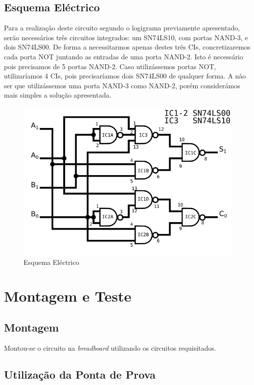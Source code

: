 \documentclass[a4paper,12pt]{article}
\begin{document}
\subsection{Esquema Eléctrico}
Para a realização deste circuito segundo o logigrama previamente apresentado, serão necessários três circuitos integrados: um SN74LS10, com portas NAND-3, e dois SN74LS00. De forma a necessitarmos apenas destes três CIs, concretizaremos cada porta NOT juntando as entradas de uma porta NAND-2. Isto é necessário pois precisamos de 5 portas NAND-2. Caso utilizássemos portas NOT, utilizaríamos 4 CIs, pois precisaríamos dois SN74LS00 de qualquer forma. A não ser que utilizássemos uma porta NAND-3 como NAND-2, porém considerámos mais simples a solução apresentada.

\begin{figure}[h]
\caption{Esquema Eléctrico}
\begin{center}
\includegraphics[scale=0.65]{SD_elect.png}
\end{center}
\end{figure}

\section{Montagem e Teste}
\subsection{Montagem}
Montou-se o circuito na {\it breadboard} utilizando os circuitos requisitados.
\subsection{Utilização da Ponta de Prova}
\pagebreak
\end{document}
